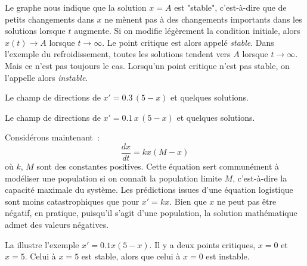 Le graphe nous indique que la solution $x=A$ est 
"stable", c'est-à-dire que de petits changements dans $x$ ne mènent pas à des changements importants dans les solutions lorsque $t$ augmente. 
Si on modifie légèrement la condition initiale, alors $x(t) \to A$ lorsque 
$t \to \infty$.  Le point critique est alors appelé 
\emph{stable}.
Dans l'exemple du refroidissement, toutes les solutions tendent vers $A$
lorsque $t \to \infty$.  Mais ce n'est pas toujours le cas.  Lorsqu'un point critique n'est pas stable, on l'appelle alors
\emph{instable}.

\begin{myfig}
\parbox[t]{3.0in}{
 \capstart
 \caption{Le champ de directions de
 $x' = 0.3\,(5-x)$ et quelques solutions.\label{2.2:coffeefig}}
}
\quad
\parbox[t]{3.0in}{
 \capstart
 \caption{Le champ de directions de 
 $x' = 0.1\,x\,(5-x)$ et quelques solutions.\label{2.2:logisticfig}}
}
\end{myfig}

\medskip

Considérons maintenant \emph{}\,: 
\begin{equation*}
\frac{dx}{dt} = kx(M-x) 
\end{equation*}
où $k$, $M$ sont des constantes positives.  
Cette équation sert communément à modéliser une population si on connaît la population limite $M$, c'est-à-dire la capacité maximale du système.  Les prédictions issues d'une équation logistique sont moins catastrophiques que pour $x'=kx$.  Bien que $x$ ne peut pas être négatif, en pratique, puisqu'il s'agit d'une population, la solution mathématique admet des valeurs négatives.

La  illustre l'exemple $x' = 0.1 x(5-x)$.
Il y a deux points critiques, $x=0$ et $x=5$.  Celui à
 $x=5$ est stable, alors que celui à $x=0$ est
instable.

